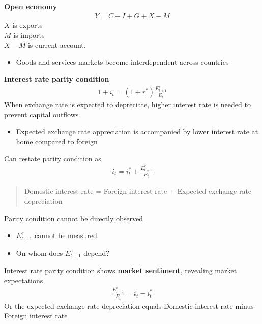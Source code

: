 \documentclass{beamer}
\begin{document}
\begin{frame}
  \textbf{Open economy}  
  \begin{align}
    Y=C+I+G+X-M
  \end{align}
  $X$ is exports\\
  $M$ is imports\\
  $X-M$ is current account.  
  \medskip
  \begin{itemize}
    \item Goods and services markets become interdependent across countries
  \end{itemize}
\end{frame}

\begin{frame}
  \textbf{Interest rate parity condition}
  \begin{align}
    1+i_t = (1+r^*) \frac{E^e_{t+1}}{E_t}
  \end{align}
  When exchange rate is expected to depreciate, higher interest rate is needed to prevent capital outflows
  \begin{itemize}
    \item Expected exchange rate appreciation is accompanied by lower interest rate at home compared to foreign
  \end{itemize}  
\end{frame}

\begin{frame}
  Can restate parity condition as
  \begin{align}
    i_t = i^*_t +  \frac{E^e_{t+1}}{E_t}
  \end{align}
  \begin{quote}
    Domestic interest rate = Foreign interest rate + Expected exchange rate depreciation
  \end{quote}
  Parity condition cannot be directly observed
  \begin{itemize}
    \item $E^e_{t+1}$ cannot be measured
    \item On whom does $E^e_{t+1}$ depend? 
  \end{itemize}  
\end{frame}

\begin{frame}
 Interest rate parity condition shows \textbf{market sentiment}, revealing market expectations
  \begin{align}
      \frac{E^e_{t+1}}{E_t} = i_t - i^*_t 
  \end{align} 
  Or the expected exchange rate depreciation equals Domestic interest rate minus Foreign interest rate  
\end{frame}
\end{document}
